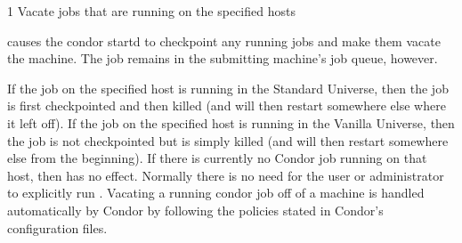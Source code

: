 \begin{ManPage}{\label{man-condor-vacate}}{1}
{Vacate jobs that are running on the specified hosts}
\Synopsis {}


\Description
{} causes the condor startd to checkpoint any running jobs
and make them vacate the machine. The job remains in
the submitting machine's job queue, however. 

If the job on the specified host is running in the Standard Universe, then the
job is first checkpointed and then killed (and will then restart somewhere
else where it left off). If the job on the specified host is running in the
Vanilla Universe, then the job is not checkpointed but is simply killed (and
will then restart somewhere else from the beginning). If there is currently
no Condor job running on that host, then  has no effect. 
 Normally there is no need for the user or administrator to explicitly run
. Vacating a running condor job off of a machine is handled
automatically by Condor by following the policies stated in Condor's
configuration files.   
\begin{Options}
\end{Options}

\end{ManPage}
